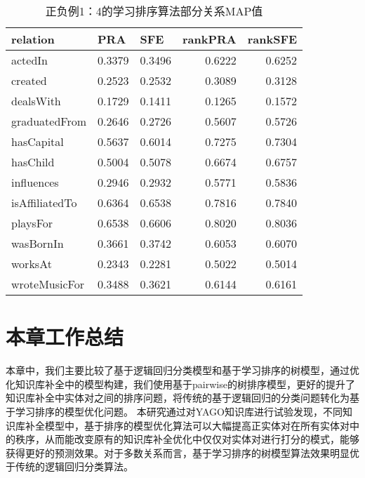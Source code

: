 \begin{table}[htbp]
  \centering
  \caption{正负例1：4的学习排序算法部分关系MAP值}
    \begin{tabular}{|l|r|r|r|r|}
    \hline
    relation & \multicolumn{1}{l|}{PRA} & \multicolumn{1}{l|}{SFE} & \multicolumn{1}{l|}{rankPRA} & \multicolumn{1}{l|}{rankSFE} \\
    \hline
    actedIn & 0.3379  & 0.3496  & 0.6222  & 0.6252  \\
    \hline
    created & 0.2523  & 0.2532  & 0.3089  & 0.3128  \\
    \hline
    dealsWith & 0.1729  & 0.1411  & 0.1265  & 0.1572  \\
    \hline
    graduatedFrom & 0.2646  & 0.2726  & 0.5607  & 0.5726  \\
    \hline
    hasCapital & 0.5637  & 0.6014  & 0.7275  & 0.7304  \\
    \hline
    hasChild & 0.5004  & 0.5078  & 0.6674  & 0.6757  \\
    \hline
    influences & 0.2946  & 0.2932  & 0.5771  & 0.5836  \\
    \hline
    isAffiliatedTo & 0.6364  & 0.6538  & 0.7816  & 0.7840  \\
    \hline
    playsFor & 0.6538  & 0.6606  & 0.8020  & 0.8036  \\
    \hline
    wasBornIn & 0.3661  & 0.3742  & 0.6053  & 0.6070  \\
    \hline
    worksAt & 0.2343  & 0.2281  & 0.5022  & 0.5014  \\
    \hline
    wroteMusicFor & 0.3488  & 0.3621  & 0.6144  & 0.6161  \\
    \hline
    \end{tabular}%
  \label{rank}%
\end{table}%

\section{本章工作总结}
本章中，我们主要比较了基于逻辑回归分类模型和基于学习排序的树模型，通过优化知识库补全中的模型构建，我们使用基于pairwise的树排序模型，更好的提升了知识库补全中实体对之间的排序问题，将传统的基于逻辑回归的分类问题转化为基于学习排序的模型优化问题。
本研究通过对YAGO知识库进行试验发现，不同知识库补全模型中，基于排序的模型优化算法可以大幅提高正实体对在所有实体对中的秩序，从而能改变原有的知识库补全优化中仅仅对实体对进行打分的模式，能够获得更好的预测效果。对于多数关系而言，基于学习排序的树模型算法效果明显优于传统的逻辑回归分类算法。
